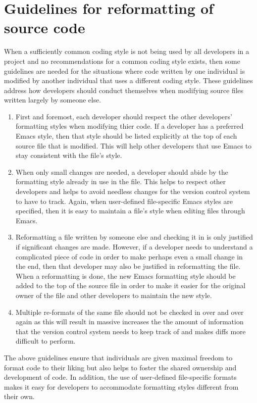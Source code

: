 %
\section{Guidelines for reformatting of source code}
\label{sec:reformatting-guidelines}
%

When a sufficiently common coding style is not being used by all developers in
a project and no recommendations for a common coding style exists, then some
guidelines are needed for the situations where code written by one individual
is modified by another individual that uses a different coding style.  These
guidelines address how developers should conduct themselves when modifying
source files written largely by someone else.

\begin{enumerate}

{}\item First and foremost, each developer should respect the other
developers' formatting styles when modifying thier code.  If a
developer has a preferred Emacs style, then that style should be
listed explicitly at the top of each source file that is modified.
This will help other developers that use Emacs to stay consistent with
the file's style.

{}\item When only small changes are needed, a developer should abide by the
formatting style already in use in the file.  This helps to respect other
developers and helps to avoid needless changes for the version control system
to have to track.  Again, when user-defined file-specific Emacs styles are
specified, then it is easy to maintain a file's style when editing files
through Emacs.

{}\item Reformatting a file written by someone else and checking it in
is only justified if significant changes are made.  However, if a
developer needs to understand a complicated piece of code in order to
make perhaps even a small change in the end, then that developer may
also be justified in reformatting the file.  When a reformatting is
done, the new Emacs formatting style should be added to the top of the
source file in order to make it easier for the original owner of the
file and other developers to maintain the new style.

{}\item Multiple re-formats of the same file should not be checked in over and
over again as this will result in massive increases the the amount of
information that the version control system needs to keep track of and makes
diffs more difficult to perform.

\end{enumerate}

The above guidelines ensure that individuals are given maximal freedom to
format code to their liking but also helps to foster the shared ownership and
development of code.  In addition, the use of user-defined file-specific
formats makes it easy for developers to accommodate formatting styles
different from their own.
